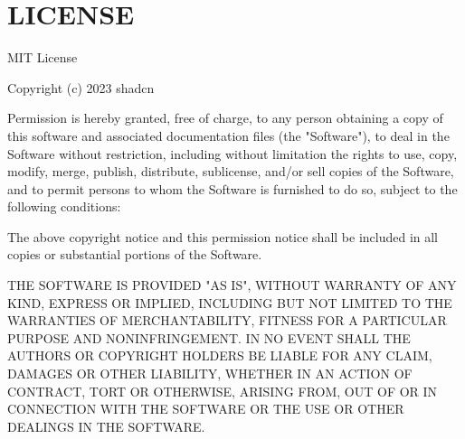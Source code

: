 \chapter{LICENSE}
\hypertarget{md_node__modules_2_0dshadcn_2ui_2_l_i_c_e_n_s_e}{}\label{md_node__modules_2_0dshadcn_2ui_2_l_i_c_e_n_s_e}
MIT License

Copyright (c) 2023 shadcn

Permission is hereby granted, free of charge, to any person obtaining a copy of this software and associated documentation files (the "{}\+Software"{}), to deal in the Software without restriction, including without limitation the rights to use, copy, modify, merge, publish, distribute, sublicense, and/or sell copies of the Software, and to permit persons to whom the Software is furnished to do so, subject to the following conditions\+:

The above copyright notice and this permission notice shall be included in all copies or substantial portions of the Software.

THE SOFTWARE IS PROVIDED "{}\+AS IS"{}, WITHOUT WARRANTY OF ANY KIND, EXPRESS OR IMPLIED, INCLUDING BUT NOT LIMITED TO THE WARRANTIES OF MERCHANTABILITY, FITNESS FOR A PARTICULAR PURPOSE AND NONINFRINGEMENT. IN NO EVENT SHALL THE AUTHORS OR COPYRIGHT HOLDERS BE LIABLE FOR ANY CLAIM, DAMAGES OR OTHER LIABILITY, WHETHER IN AN ACTION OF CONTRACT, TORT OR OTHERWISE, ARISING FROM, OUT OF OR IN CONNECTION WITH THE SOFTWARE OR THE USE OR OTHER DEALINGS IN THE SOFTWARE. 
